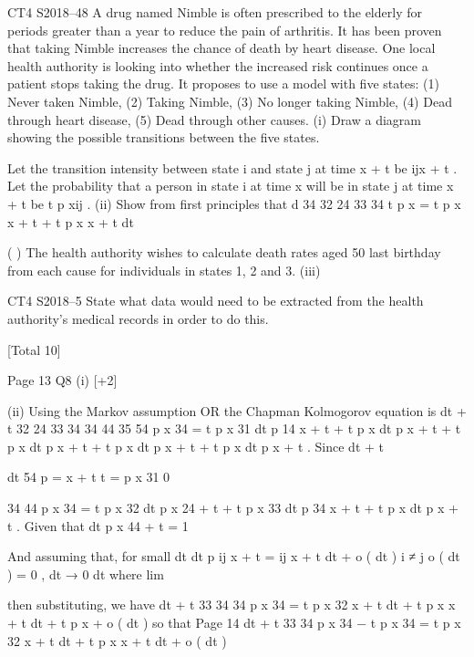 \documentclass[a4paper,12pt]{article}
\begin{document}
CT4 S2018–48
A drug named Nimble is often prescribed to the elderly for periods greater than a year
to reduce the pain of arthritis. It has been proven that taking Nimble increases the
chance of death by heart disease. One local health authority is looking into whether
the increased risk continues once a patient stops taking the drug. It proposes to use
a model with five states: (1) Never taken Nimble, (2) Taking Nimble, (3) No longer
taking Nimble, (4) Dead through heart disease, (5) Dead through other causes.
(i)
Draw a diagram showing the possible transitions between the five states.

Let the transition intensity between state i and state j at time x + t be \mu ijx + t . Let the
probability that a person in state i at time x will be in state j at time x + t be t p xij .
(ii)
Show from first principles that
d
34
32 24
33 34
t p x = t p x \mu x + t + t p x \mu x + t
dt

(
)
The health authority wishes to calculate death rates aged 50 last birthday from each
cause for individuals in states 1, 2 and 3.
(iii)

CT4 S2018–5 
State what data would need to be extracted from the health authority’s medical
records in order to do this.

[Total 10]



Page 13
Q8
(i)
[+2]

(ii)
Using the Markov assumption
OR
the Chapman Kolmogorov equation is
dt + t
32
24
33
34
34
44
35
54
p x 34 = t p x 31 dt p 14
x + t + t p x dt p x + t + t p x dt p x + t + t p x dt p x + t + t p x dt p x + t .
Since
dt + t

dt
54
p =
x + t
t
=
p x 31 0

34
44
p x 34 = t p x 32 dt p x 24 + t + t p x 33 dt p 34
x + t + t p x dt p x + t .
Given that
dt
p x 44 + t = 1


And assuming that, for small dt
dt
p ij x + t =
\mu ij x + t dt + o ( dt )
i ≠ j
o ( dt )
= 0 ,
dt → 0 dt
where lim


then substituting, we have
dt + t
33 34
34
p x 34 = t p x 32 
x + t dt + t p x \mu x + t dt + t p x + o ( dt )
so that
Page 14
dt + t
33 34
p x 34 − t p x 34 = t p x 32 
x + t dt + t p x \mu x + t dt + o ( dt )
\end{document}
